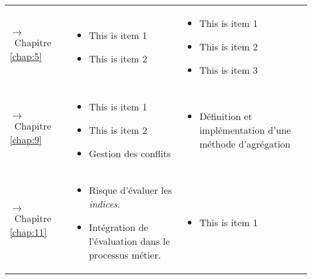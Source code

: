 \begin{tabular}{L{5cm}L{8cm}L{8cm}}
{\par\footnotesize\hspace{.25cm}$\longrightarrow$~Chapitre
\ref{chap:5}} & \begin{minipage}{7.5cm}
    \begin{itemize}
    \item This is item 1
    \item This is item 2
    \end{itemize}
  \end{minipage}& \begin{minipage}{7.5cm}
    \begin{itemize}
    \item This is item 1
    \item This is item 2
    \item This is item 3
    \end{itemize}
  \end{minipage} \\
  
{\par\footnotesize\hspace{.25cm}$\longrightarrow$~Chapitre
\ref{chap:9}} & \begin{minipage}{7.5cm}
    \begin{itemize}
    \item This is item 1
    \item This is item 2
    \item Gestion des conflits
    \end{itemize}
  \end{minipage}& \begin{minipage}{7.5cm}
    \begin{itemize}
    \item Définition et implémentation d'une méthode d'agrégation
    \end{itemize}
  \end{minipage} \\
  
{\par\footnotesize\hspace{.25cm}$\longrightarrow$~Chapitre
\ref{chap:11}} & \begin{minipage}{7.5cm} \small
    \begin{itemize}
    \item Risque d'évaluer les \emph{indices}.
    \item Intégration de l'évaluation dans le processus métier.
    \end{itemize}
  \end{minipage}& \begin{minipage}{7.5cm}
    \begin{itemize}
    \item This is item 1
    \end{itemize}
  \end{minipage}\\
  
  \bottomrule
\end{tabular}

